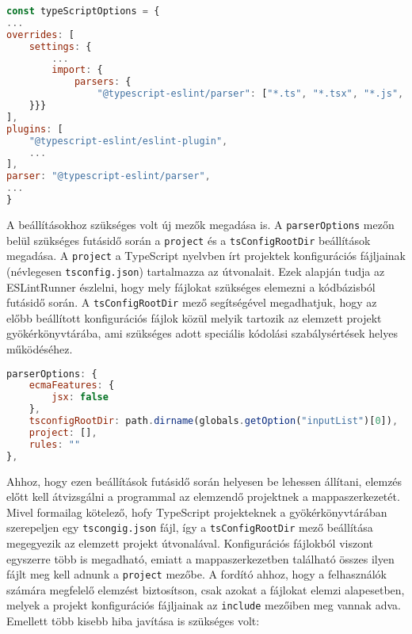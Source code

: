 \begin{lstlisting}[caption={Elemző és bővítmény megadása},label={lst:tsconfig}, language={JavaScript},basicstyle=\fontsize{9}{11}\selectfont\ttfamily]
const typeScriptOptions = {
...
overrides: [
    settings: {
        ...
        import: {
            parsers: {
                "@typescript-eslint/parser": ["*.ts", "*.tsx", "*.js", "*.jsx"],
    }}}
],
plugins: [
    "@typescript-eslint/eslint-plugin",
    ...
],
parser: "@typescript-eslint/parser",
...
}
    \end{lstlisting}

A beállításokhoz szükséges volt új mezők megadása is. A \texttt{parserOptions} mezőn belül szükséges futásidő során a \texttt{project} és a \texttt{tsConfigRootDir} beállítások megadása. A \texttt{project} a TypeScript nyelvben írt projektek konfigurációs fájljainak (névlegesen \texttt{tsconfig.json}) tartalmazza az útvonalait. Ezek alapján tudja az ESLintRunner észlelni, hogy mely fájlokat szükséges elemezni a kódbázisból futásidő során. A \texttt{tsConfigRootDir} mező segítségével megadhatjuk, hogy az előbb beállított konfigurációs fájlok közül melyik tartozik az elemzett projekt gyökérkönyvtárába, ami szükséges adott speciális kódolási szabálysértések helyes működéséhez.

\begin{lstlisting}[caption={Szabálysértések megadása .json állományban},label={lst:jsonconfig}, language={JavaScript}]
parserOptions: {
    ecmaFeatures: {
        jsx: false
    },
    tsconfigRootDir: path.dirname(globals.getOption("inputList")[0]),
    project: [],
    rules: ""
},
\end{lstlisting}

Ahhoz, hogy ezen beállítások futásidő során helyesen be lehessen állítani, elemzés előtt kell átvizsgálni a programmal az elemzendő projektnek a mappaszerkezetét. Mivel formailag kötelező, hofy TypeScript projekteknek a gyökérkönyvtárában szerepeljen egy \texttt{tscongig.json} fájl, így a \texttt{tsConfigRootDir} mező beállítása megegyezik az elemzett projekt útvonalával. Konfigurációs fájlokból viszont egyszerre több is megadható, emiatt a mappaszerkezetben található összes ilyen fájlt meg kell adnunk a \texttt{project} mezőbe. 
A fordító ahhoz, hogy a felhasználók számára megfelelő elemzést biztosítson, csak azokat a fájlokat elemzi alapesetben, melyek a projekt konfigurációs fájljainak az \texttt{include} mezőiben meg vannak adva. Emellett több kisebb hiba javítása is szükséges volt:

